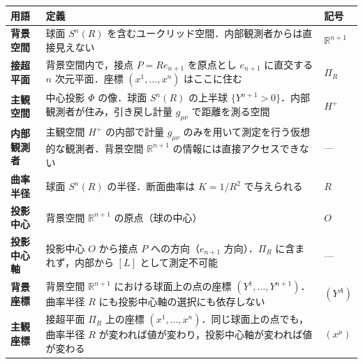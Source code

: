 \documentclass[a4paper,11pt]{ltjsarticle}
\theoremstyle{definition}
\begin{document}
{\def\LTcaptype{table} %
\begin{longtable}[]{@{}
  >{\raggedright\arraybackslash}p{}
  >{\raggedright\arraybackslash}p{}
  >{\raggedright\arraybackslash}p{}@{}}
\toprule\noalign{}
\begin{minipage}[b]{\linewidth}\raggedright
用語
\end{minipage} & \begin{minipage}[b]{\linewidth}\raggedright
定義
\end{minipage} & \begin{minipage}[b]{\linewidth}\raggedright
記号
\end{minipage} \\
\midrule\noalign{}
\endhead
\bottomrule\noalign{}
\endlastfoot
\textbf{背景空間} & 球面 \(S^n(R)\) を含むユークリッド空間．内部観測者からは直接見えない & \(\mathbb{R}^{n+1}\) \\
\textbf{接超平面} & 背景空間内で，接点 \(P = Re_{n+1}\) を原点とし \(e_{n+1}\) に直交する \(n\) 次元平面．座標 \((x^1, \ldots, x^n)\) はここに住む & \(\Pi_R\) \\
\textbf{主観空間} & 中心投影 \(\Phi\) の像．球面 \(S^n(R)\) の上半球 \(\{Y^{n+1} > 0\}\)．内部観測者が住み，引き戻し計量 \(g_{\mu\nu}\) で距離を測る空間 & \(H^+\) \\
\textbf{内部観測者} & 主観空間 \(H^+\) の内部で計量 \(g_{\mu\nu}\) のみを用いて測定を行う仮想的な観測者．背景空間 \(\mathbb{R}^{n+1}\) の情報には直接アクセスできない & --- \\
\textbf{曲率半径} & 球面 \(S^n(R)\) の半径．断面曲率は \(K = 1/R^2\) で与えられる & \(R\) \\
\textbf{投影中心} & 背景空間 \(\mathbb{R}^{n+1}\) の原点（球の中心） & \(O\) \\
\textbf{投影中心軸} & 投影中心 \(O\) から接点 \(P\) への方向（\(e_{n+1}\) 方向）．\(\Pi_R\) に含まれず，内部から \([L]\) として測定不可能 & --- \\
\textbf{背景座標} & 背景空間 \(\mathbb{R}^{n+1}\) における球面上の点の座標 \((Y^1, \ldots, Y^{n+1})\)．曲率半径 \(R\) にも投影中心軸の選択にも依存しない & \((Y^A)\) \\
\textbf{主観座標} & 接超平面 \(\Pi_R\) 上の座標 \((x^1, \ldots, x^n)\)．同じ球面上の点でも，曲率半径 \(R\) が変われば値が変わり，投影中心軸が変われば値が変わる & \((x^\mu)\) \\
\end{longtable}
}
\end{document}

